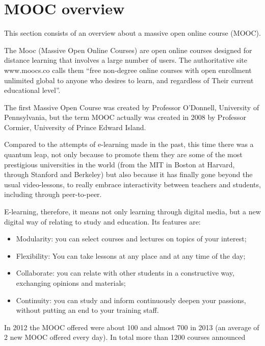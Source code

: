 \section{MOOC overview}
\label{sec:mooc_overview}

This section consists of an overview about a massive open online course (MOOC).

The Mooc (Massive Open Online Courses) are open online courses designed for distance learning that involves a large number of users.
The authoritative site www.moocs.co calls them “free non-degree online courses with open enrollment unlimited global to anyone who desires to learn, and regardless of Their current educational level”. \cite{mooc_def}

The first Massive Open Course was created by Professor O'Donnell, University of Pennsylvania, but the term MOOC actually was created in 2008 by Professor Cormier, University of Prince Edward Island.

Compared to the attempts of e-learning made in the past, this time there was a quantum leap, not only because to promote them they are some of the most prestigious universities in the world (from the MIT in Boston at Harvard, through Stanford and Berkeley) but also because it has finally gone beyond the usual video-lessons, to really embrace interactivity between teachers and students, including through peer-to-peer.

E-learning, therefore, it means not only learning through digital media, but a new digital way of relating to study and education.
Its features are:
\begin{itemize}
\item Modularity: you can select courses and lectures on topics of your interest;
\item Flexibility: You can take lessons at any place and at any time of the day;
\item Collaborate: you can relate with other students in a constructive way, exchanging opinions and materials;
\item Continuity: you can study and inform continuously deepen your passions, without putting an end to your training staff.
\end{itemize}

In 2012 the MOOC offered were about 100 and almost 700 in 2013 (an average of 2 new MOOC offered every day). In total more than 1200 courses announced


